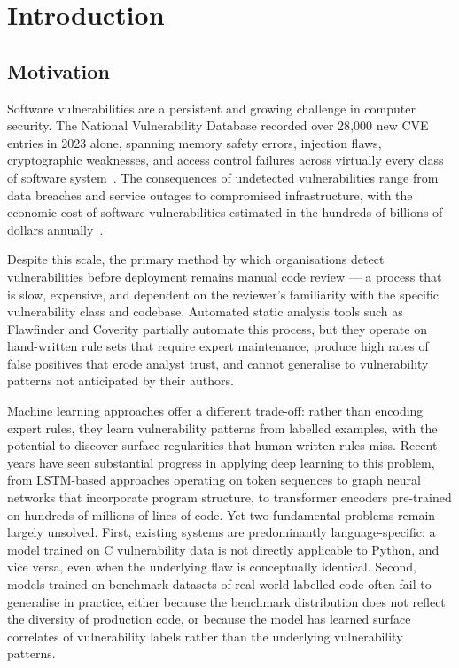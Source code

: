 \chapter{Introduction}

\section{Motivation}

Software vulnerabilities are a persistent and growing challenge in computer security.
The National Vulnerability Database recorded over 28{,}000 new CVE entries in 2023 alone,
spanning memory safety errors, injection flaws, cryptographic weaknesses, and access control failures
across virtually every class of software system~\cite{cvedetails2023}.
The consequences of undetected vulnerabilities range from data breaches and service outages
to compromised infrastructure, with the economic cost of software vulnerabilities estimated
in the hundreds of billions of dollars annually~\cite{mcafee2020cybercrime}.

Despite this scale, the primary method by which organisations detect vulnerabilities before
deployment remains manual code review --- a process that is slow, expensive, and dependent on
the reviewer's familiarity with the specific vulnerability class and codebase.
Automated static analysis tools such as Flawfinder and Coverity partially automate this process,
but they operate on hand-written rule sets that require expert maintenance, produce high rates of
false positives that erode analyst trust, and cannot generalise to vulnerability patterns
not anticipated by their authors.

Machine learning approaches offer a different trade-off: rather than encoding expert rules,
they learn vulnerability patterns from labelled examples, with the potential to discover
surface regularities that human-written rules miss.
Recent years have seen substantial progress in applying deep learning to this problem,
from LSTM-based approaches operating on token sequences to graph neural networks that
incorporate program structure, to transformer encoders pre-trained on hundreds of millions
of lines of code.
Yet two fundamental problems remain largely unsolved.
First, existing systems are predominantly language-specific: a model trained on C vulnerability
data is not directly applicable to Python, and vice versa, even when the underlying flaw
is conceptually identical.
Second, models trained on benchmark datasets of real-world labelled code often fail to
generalise in practice, either because the benchmark distribution does not reflect the
diversity of production code, or because the model has learned surface correlates of
vulnerability labels rather than the underlying vulnerability patterns.

